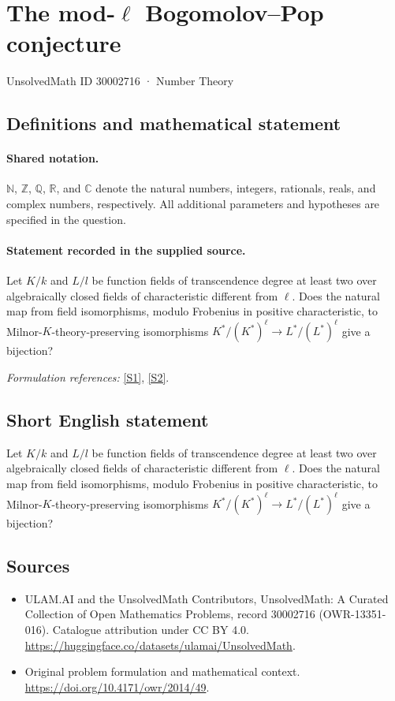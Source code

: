 \documentclass[11pt]{article}
\newcommand{\sref}[2]{\hyperlink{source:#1:#2}{[S#2]}}
\begin{document}
\setcounter{section}{30002715}
\section{\texorpdfstring{The mod-$\ell$ Bogomolov–Pop conjecture}{The mod-ell Bogomolov–Pop conjecture}}\label{30002716}
{\small UnsolvedMath ID 30002716 · Number Theory}
\subsection{Definitions and mathematical statement}

\paragraph{Shared notation.}$\mathbb N$, $\mathbb Z$, $\mathbb Q$, $\mathbb R$, and $\mathbb C$ denote the natural numbers, integers, rationals, reals, and complex numbers, respectively. All additional parameters and hypotheses are specified in the question.


\paragraph{Statement recorded in the supplied source.}
Let $K/k$ and $L/l$ be function fields of transcendence degree at least two over algebraically closed fields of characteristic different from $\ell$. Does the natural map from field isomorphisms, modulo Frobenius in positive characteristic, to Milnor-$K$-theory-preserving isomorphisms $K^*/(K^*)^\ell\to L^*/(L^*)^\ell$ give a bijection?
\par\smallskip\textit{Formulation references:} \sref{30002716}{1}, \sref{30002716}{2}.
\subsection{Short English statement}
Let $K/k$ and $L/l$ be function fields of transcendence degree at least two over algebraically closed fields of characteristic different from $\ell$. Does the natural map from field isomorphisms, modulo Frobenius in positive characteristic, to Milnor-$K$-theory-preserving isomorphisms $K^*/(K^*)^\ell\to L^*/(L^*)^\ell$ give a bijection?
\subsection{Sources}
\begin{itemize}
\item[\hypertarget{source:30002716:1}{S1}] ULAM.AI and the UnsolvedMath Contributors, UnsolvedMath: A Curated Collection of Open Mathematics Problems, record 30002716 (OWR-13351-016). Catalogue attribution under CC BY 4.0.
\url{https://huggingface.co/datasets/ulamai/UnsolvedMath}.
\item[\hypertarget{source:30002716:2}{S2}] Original problem formulation and mathematical context.
\url{https://doi.org/10.4171/owr/2014/49}.
\end{itemize}
\label{end:30002716}
\end{document}
